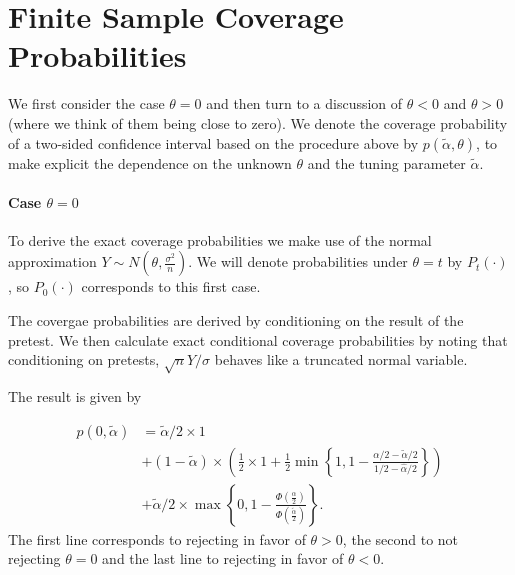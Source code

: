 \documentclass[12pt,a4paper,english]{article} %
\numberwithin{equation}{section}
\theoremstyle{definition}
\theoremstyle{remark}
\theoremstyle{plain}
\begin{document}
\section{Finite Sample Coverage Probabilities}

We first consider the case $\theta = 0$ and then turn to a discussion of $\theta < 0$ and $\theta > 0$ (where we think of them being close to zero).
We denote the coverage probability of a two-sided confidence interval based on the procedure above by $p(\tilde{\alpha}, \theta)$, to make explicit the dependence on the unknown $\theta$ and the tuning parameter $\tilde{\alpha}$.

\paragraph{Case $\theta = 0$}
To derive the exact coverage probabilities we make use of the normal approximation $Y\sim N(\theta, \frac{\sigma^2}{n})$.
We will denote probabilities under $\theta = t$ by $P_t(\cdot)$, so $P_0(\cdot)$ corresponds to this first case.

The covergae probabilities are derived by conditioning on the result of the pretest.
We then calculate exact conditional coverage probabilities by noting that conditioning on pretests, $\sqrt{n}Y/\sigma$ behaves like a truncated normal variable.

The result is given by

\begin{align*}
  p(0, \tilde{\alpha}) & =  \tilde{\alpha}/2 \times 1 \\
  & + (1 - \tilde{\alpha}) \times \left(\frac{1}{2} \times 1 + \frac{1}{2} \min\left\{1, 1 - \frac{\alpha/2 - \tilde{\alpha}/2}{1/2 - \hat{\alpha}/2}\right\}\right) \\
  & + \tilde{\alpha}/2 \times \max\left\{0, 1 - \frac{\Phi(\frac{\alpha}{2})}{\Phi(\frac{\tilde{\alpha}}{2})}\right\}.
\end{align*}
The first line corresponds to rejecting in favor of $\theta > 0$, the second to not rejecting $\theta = 0$ and the last line to rejecting in favor of $\theta < 0$.
\end{document}
